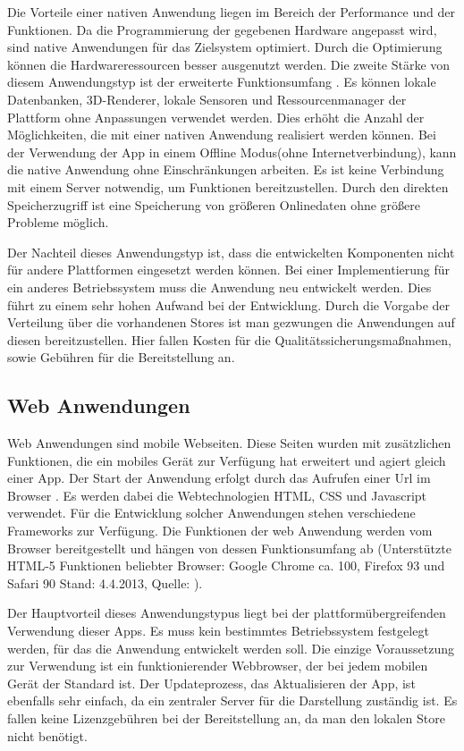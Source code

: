  Die Vorteile einer nativen Anwendung liegen im Bereich der Performance und der Funktionen. Da die Programmierung der gegebenen Hardware angepasst wird, sind native Anwendungen für das Zielsystem optimiert. Durch die Optimierung können die Hardwareressourcen besser ausgenutzt werden. Die zweite Stärke von diesem Anwendungstyp ist der erweiterte Funktionsumfang \cite{bib:nativeBS2}. Es können lokale Datenbanken, 3D-Renderer, lokale Sensoren und Ressourcenmanager der Plattform ohne Anpassungen verwendet werden. Dies erhöht die Anzahl der Möglichkeiten, die mit einer nativen Anwendung realisiert werden können. Bei der Verwendung der App in einem Offline Modus(ohne Internetverbindung), kann die native Anwendung ohne Einschränkungen arbeiten. Es ist keine Verbindung mit einem Server notwendig, um Funktionen bereitzustellen. Durch den direkten Speicherzugriff ist eine Speicherung von größeren Onlinedaten ohne größere Probleme möglich. \par
 
 Der Nachteil dieses Anwendungstyp ist, dass die entwickelten Komponenten nicht für andere Plattformen eingesetzt werden können. Bei einer Implementierung für ein anderes Betriebssystem muss die Anwendung neu entwickelt werden. Dies führt zu einem sehr hohen Aufwand bei der Entwicklung. Durch die Vorgabe der Verteilung über die vorhandenen Stores ist man gezwungen die Anwendungen auf diesen bereitzustellen. Hier fallen Kosten für die Qualitätssicherungsmaßnahmen, sowie Gebühren für die Bereitstellung an.

\subsection{Web Anwendungen}
Web Anwendungen sind mobile Webseiten. Diese Seiten wurden mit zusätzlichen Funktionen, die ein mobiles Gerät zur Verfügung hat erweitert und agiert gleich einer App. Der Start der Anwendung erfolgt durch das Aufrufen einer Url im Browser . Es werden dabei die Webtechnologien HTML, CSS und Javascript verwendet. Für die Entwicklung solcher Anwendungen stehen verschiedene Frameworks zur Verfügung. Die Funktionen der web Anwendung werden vom Browser bereitgestellt und hängen von dessen Funktionsumfang ab (Unterstützte HTML-5 Funktionen beliebter Browser: Google Chrome ca. 100, Firefox 93 und Safari 90 Stand: 4.4.2013, Quelle: \cite{bib:webapp}).   \par

Der Hauptvorteil dieses Anwendungstypus liegt bei der plattformübergreifenden Verwendung dieser Apps. Es muss kein bestimmtes Betriebssystem festgelegt werden, für das die Anwendung entwickelt werden soll. Die einzige Voraussetzung zur Verwendung ist ein funktionierender Webbrowser, der bei jedem mobilen Gerät der Standard ist. Der Updateprozess, das Aktualisieren der App, ist ebenfalls sehr einfach, da ein zentraler Server für die Darstellung zuständig ist. Es fallen keine Lizenzgebühren bei der Bereitstellung an, da man den lokalen Store nicht benötigt. 

